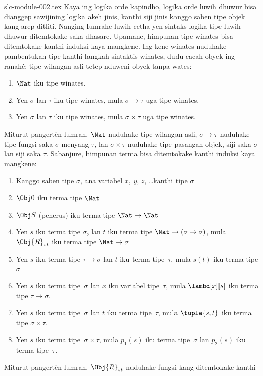 \begin{filecontents*}[overwrite]{slc-module-002.tex}
Kaya ing logika orde kapindho, logika orde luwih
dhuwur bisa dianggep sawijining logika akeh
jinis, kanthi siji jinis kanggo saben tipe
objek kang arep ditliti. Nanging lumrahe
luwih cetha yen sintaks logika tipe luwih
dhuwur ditemtokake saka dhasare. Upamane,
himpunan tipe winates bisa ditemtokake
kanthi induksi kaya mangkene. Ing kene winates nuduhake pambentukan tipe kanthi langkah sintaktis winates, dudu cacah obyek ing ranahé; tipe wilangan asli tetep nduweni obyek tanpa wates:
\begin{enumerate}
\item $\Nat$ iku tipe winates.
\item Yen $\sigma$ lan $\tau$ iku tipe winates,
  mula $\sigma \to \tau$ uga tipe winates.
\item Yen $\sigma$ lan $\tau$ iku tipe winates,
  mula $\sigma \times \tau$ uga tipe winates.
\end{enumerate}
Miturut pangertèn lumrah, $\Nat$ nuduhake
tipe wilangan asli, $\sigma \to \tau$ nuduhake
tipe fungsi saka $\sigma$ menyang $\tau$,
lan $\sigma \times \tau$ nuduhake tipe pasangan
objek, siji saka $\sigma$ lan siji saka $\tau$.
Sabanjure, himpunan terma bisa ditemtokake
kanthi induksi kaya mangkene:
\begin{enumerate}
\item Kanggo saben tipe $\sigma$, ana variabel
  $x$, $y$, $z$, \dots kanthi tipe $\sigma$
\item $\Obj 0$ iku terma tipe $\Nat$
\item $\Obj S$ (penerus) iku terma tipe
  $\Nat \to \Nat$
\item Yen $s$ iku terma tipe $\sigma$, lan
  $t$ iku terma tipe $\Nat \to (\sigma \to \sigma)$,
  mula $\Obj{R}_{st}$ iku terma tipe
  $\Nat \to \sigma$
\item Yen $s$ iku terma tipe $\tau \to \sigma$
  lan $t$ iku terma tipe~$\tau$, mula $s(t)$
  iku terma tipe $\sigma$
\item Yen $s$ iku terma tipe~$\sigma$ lan $x$
  iku variabel tipe~$\tau$, mula
  $\lambd[x][s]$ iku terma tipe
  $\tau \to \sigma$.
\item Yen $s$ iku terma tipe~$\sigma$ lan $t$
  iku terma tipe~$\tau$, mula $\tuple{s, t}$
  iku terma tipe $\sigma \times \tau$.
\item Yen $s$ iku terma tipe~$\sigma \times \tau$,
  mula $p_1(s)$ iku terma tipe~$\sigma$ lan
  $p_2(s)$ iku terma tipe~$\tau$.
\end{enumerate}
Miturut pangertèn lumrah, $\Obj{R}_{st}$
nuduhake fungsi kang ditemtokake kanthi

\end{filecontents*}
